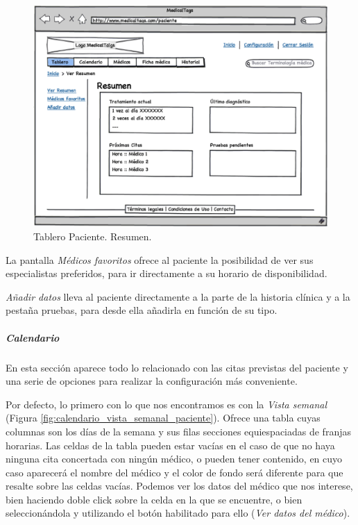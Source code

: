 		\begin{figure}[H]
		  \centering
		    \includegraphics[width=12cm]{img/eps/26_Tablero_Paciente1.eps}
		  \caption{Tablero Paciente. Resumen.}
		  \label{fig:tablero_paciente_resumen}
		\end{figure}
		
		La pantalla \textit{Médicos favoritos} ofrece al paciente la posibilidad de ver sus especialistas preferidos, para ir directamente a su horario de disponibilidad.	
		
		\textit{Añadir datos} lleva al paciente directamente a la parte de la historia clínica y a la pestaña pruebas, para desde ella añadirla en función de su tipo.
		
		
		
		\subparagraph{Calendario} %
		\label{par:paciente_calendario}
		
		En esta sección aparece todo lo relacionado con las citas previstas del paciente y una serie de opciones para realizar la configuración  más conveniente.
		
		Por defecto, lo primero con lo que nos encontramos es con la \textit{Vista semanal} (Figura \ref{fig:calendario_vista_semanal_paciente}). Ofrece una tabla cuyas columnas son los días de la semana y sus filas secciones equiespaciadas de franjas horarias. Las celdas de la tabla pueden estar vacías en el caso de que no haya ninguna cita concertada con ningún médico, o pueden tener contenido, en cuyo caso aparecerá el nombre del médico y el color de fondo será diferente para que resalte sobre las celdas vacías. Podemos ver los datos del médico que nos interese, bien haciendo doble click sobre la celda en la que se encuentre, o bien seleccionándola y utilizando el botón habilitado para ello (\textit{Ver datos del médico}). 
		
